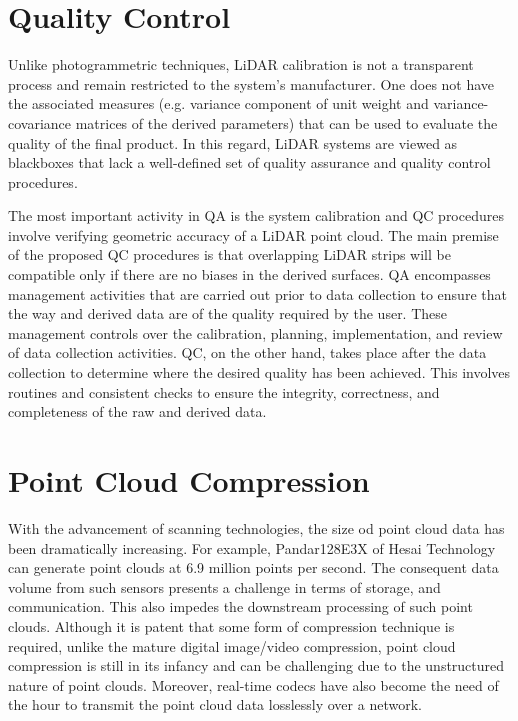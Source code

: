 \section{Quality Control}
Unlike photogrammetric techniques, LiDAR calibration is not a transparent process and remain restricted to the system's manufacturer. One does not have the associated measures (e.g. variance component of unit weight and variance-covariance matrices of the derived parameters) that can be used to evaluate the quality of the final product. In this regard, LiDAR systems are viewed as blackboxes that lack a well-defined set of quality assurance and quality control procedures. 

The most important activity in QA is the system calibration and QC procedures involve verifying geometric accuracy of a LiDAR point cloud. The main premise of the proposed QC procedures is that overlapping LiDAR strips will be compatible only if there are no biases in the derived surfaces. QA encompasses management activities that are carried out prior to data collection to ensure that the way and derived data are of the quality required by the user. These management controls over the calibration, planning, implementation, and review of data collection activities. QC, on the other hand, takes place after the data collection to determine where the desired quality has been achieved. This involves routines and consistent checks to ensure the integrity, correctness, and completeness of the raw and derived data.




\section{Point Cloud Compression}
With the advancement of scanning technologies, the size od point cloud data has been dramatically increasing. For example, Pandar128E3X of Hesai Technology can generate point clouds at 6.9 million points per second. The consequent data volume from such sensors presents a challenge in terms of storage, and communication. This also impedes the downstream processing of such point clouds. Although it is patent that some form of compression technique is required, unlike the mature digital image/video compression, point cloud compression is still in its infancy and can be challenging due to the unstructured nature of point clouds. Moreover, real-time codecs have also become the need of the hour to transmit the point cloud data losslessly over a network.

